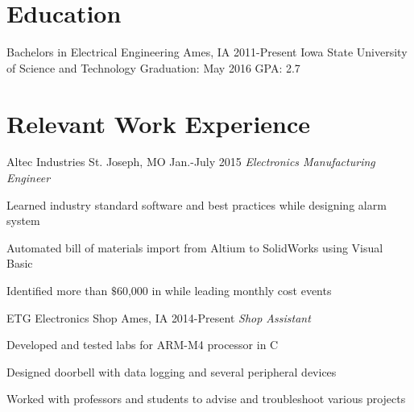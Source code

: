 \documentclass[]{friggeri-cv} %
\begin{document}
\section{Education}
\begin{entrylist}
\entry
{Bachelors in Electrical Engineering}
{Ames, IA}
{2011-Present}
{Iowa State University of Science and Technology}
{Graduation: May 2016 \newline
GPA: 2.7}

\end{entrylist}
\section{Relevant Work Experience}
\begin{entrylist}
\entry
{Altec Industries}
{St. Joseph, MO}
{Jan.-July 2015}
{\emph{Electronics Manufacturing Engineer}}
{\begin{itemizenosep}
	\item Learned industry standard software and best practices while designing alarm system
	\item Automated bill of materials import from Altium to SolidWorks using Visual Basic
	\item  Identified more than $\$$60,000 in while leading monthly cost events
\end{itemizenosep}}
\entry
{ETG Electronics Shop}
{Ames, IA}
{2014-Present}
{\emph{Shop Assistant}}
{\begin{itemizenosep}
	\item Developed and tested labs for ARM-M4 processor in C
	\item Designed doorbell with data logging and several peripheral devices 
	\item Worked with professors and students to advise and troubleshoot various projects
\end{itemizenosep}}
\end{entrylist}
\end{document}
